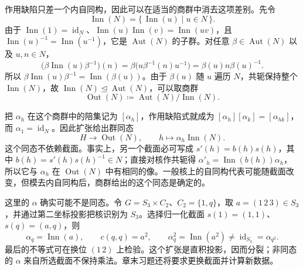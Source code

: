 作用缺陷只差一个内自同构，因此可以在适当的商群中消去这项差别。先令
\[
	\operatorname{Inn}(N)=\{\,\operatorname{Inn}(u)\mid u\in N\,\}.
\]
由于 \(\operatorname{Inn}(1)=\operatorname{id}_N\)、\(\operatorname{Inn}(u)\operatorname{Inn}(v)=\operatorname{Inn}(uv)\)，且 \(\operatorname{Inn}(u)^{-1}=\operatorname{Inn}(u^{-1})\)，它是 \(\operatorname{Aut}(N)\) 的子群。对任意 \(\beta\in\operatorname{Aut}(N)\) 以及 \(u,n\in N\)，
\[
	\bigl(\beta\operatorname{Inn}(u)\beta^{-1}\bigr)(n) =\beta\bigl(u\beta^{-1}(n)u^{-1}\bigr) =\beta(u)n\beta(u)^{-1}.
\]
所以 \(\beta\operatorname{Inn}(u)\beta^{-1}=\operatorname{Inn}(\beta(u))\)。由于 \(\beta(u)\) 随 \(u\) 遍历 \(N\)，共轭保持整个 \(\operatorname{Inn}(N)\)，故 \(\operatorname{Inn}(N)\trianglelefteq\operatorname{Aut}(N)\)，可以取商群
\[
	\operatorname{Out}(N)\coloneqq\operatorname{Aut}(N)/\operatorname{Inn}(N).
\]

把 \(\alpha_h\) 在这个商群中的陪集记为 \([\alpha_h]\)，作用缺陷式就成为 \([\alpha_h][\alpha_k]=[\alpha_{hk}]\)，而 \(\alpha_1=\operatorname{id}_N\)。因此扩张给出群同态
\[
	H\longrightarrow\operatorname{Out}(N),\qquad h\longmapsto\alpha_h\operatorname{Inn}(N).
\]
这个同态不依赖截面。事实上，另一个截面必可写成 \(s'(h)=b(h)s(h)\)，其中 \(b(h)=s'(h)s(h)^{-1}\in N\)；直接对核作共轭得 \(\alpha'_h=\operatorname{Inn}(b(h))\alpha_h\)，所以它与 \(\alpha_h\) 在 \(\operatorname{Out}(N)\) 中有相同的像。一般核上的自同构代表可能随截面改变，但模去内自同构后，商群给出的这个同态是确定的。

\ProseParagraphBreak
这里的 \(\alpha\) 确实可能不是同态。令 \(G=S_3\times C_2\)、\(C_2=\{1,q\}\)，取 \(a=(1\,2\,3)\in S_3\)，并通过第二坐标投影把核识别为 \(S_3\)。选择归一化截面 \(s(1)=(1,1)\)、\(s(q)=(a,q)\)，则
\[
	\alpha_q=\operatorname{Inn}(a),\qquad c(q,q)=a^2, \qquad \alpha_q^2=\operatorname{Inn}(a^2)\neq\operatorname{id}_{S_3}=\alpha_{q^2}.
\]
最后的不等式可在换位 \((1\,2)\) 上检验。这个扩张是直积投影，因而分裂；非同态的 \(\alpha\) 来自所选截面不保持乘法。章末习题还将要求更换截面并计算新数据。

